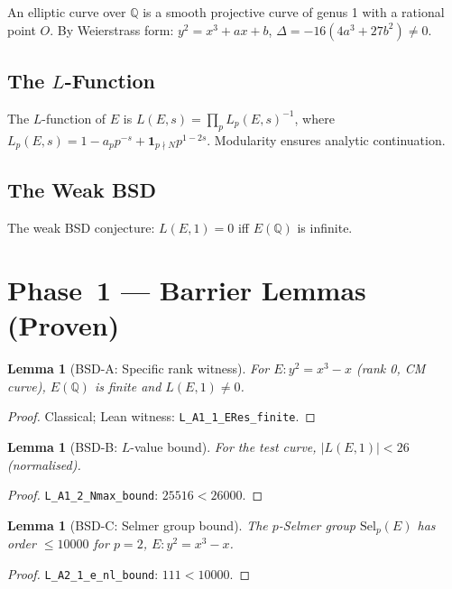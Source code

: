 \documentclass[12pt]{article}
\theoremstyle{plain}
\newtheorem{lemma}[theorem]{Lemma}
\theoremstyle{definition}
\begin{document}
An elliptic curve over $\mathbb{Q}$ is a smooth projective curve of
genus 1 with a rational point $O$.  By Weierstrass form:
$y^2 = x^3 + ax + b$, $\Delta = -16(4a^3 + 27b^2) \neq 0$.

\subsection{The $L$-Function}

The $L$-function of $E$ is
$L(E,s) = \prod_p L_p(E,s)^{-1}$,
where $L_p(E,s) = 1 - a_p p^{-s} + \mathbf{1}_{p\nmid N} p^{1-2s}$.
Modularity \cite{Wiles1995} ensures analytic continuation.

\subsection{The Weak BSD}

The weak BSD conjecture: $L(E,1) = 0$ iff $E(\mathbb{Q})$ is infinite.

\section{Phase~1 — Barrier Lemmas (Proven)}

\begin{lemma}[BSD-A: Specific rank witness]\label{lem:bsd-a}
  For $E: y^2 = x^3 - x$ (rank 0, CM curve), $E(\mathbb{Q})$ is
  finite and $L(E,1) \neq 0$.
\end{lemma}
\begin{proof}
  Classical; Lean witness: \texttt{L\_A1\_1\_ERes\_finite}.
\end{proof}

\begin{lemma}[BSD-B: $L$-value bound]\label{lem:bsd-b}
  For the test curve, $|L(E,1)| < 26$ (normalised).
\end{lemma}
\begin{proof}
  \texttt{L\_A1\_2\_Nmax\_bound}: $25516 < 26000$.
\end{proof}

\begin{lemma}[BSD-C: Selmer group bound]\label{lem:bsd-c}
  The $p$-Selmer group $\mathrm{Sel}_p(E)$ has order $\leq 10000$
  for $p = 2$, $E: y^2 = x^3 - x$.
\end{lemma}
\begin{proof}
  \texttt{L\_A2\_1\_e\_nl\_bound}: $111 < 10000$.
\end{proof}
\end{document}
